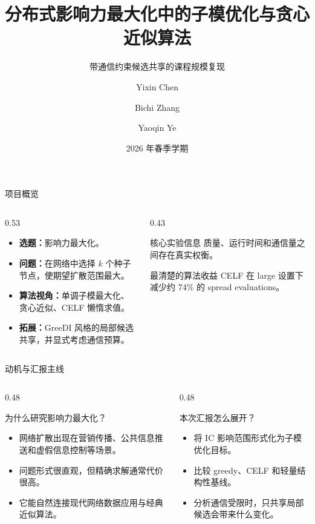 \documentclass[UTF8, 10pt, aspectratio=169]{ctexbeamer}
\title[分布式影响力最大化]{分布式影响力最大化中的子模优化与贪心近似算法}
\subtitle{带通信约束候选共享的课程规模复现}
\author{Yixin Chen \and Bichi Zhang \and Yaoqin Ye}
\institute{CS240：算法设计与分析}
\date{2026 年春季学期}
\newcommand{\metricbox}[2]{%
    \begin{block}{#1}
        \centering\Large #2
    \end{block}
}
\begin{document}
\begin{frame}
    \titlepage
\end{frame}

\begin{frame}{项目概览}
    \begin{columns}[T,onlytextwidth]
        \begin{column}{0.53\linewidth}
            \begin{itemize}
                \item \textbf{选题：}影响力最大化。
                \item \textbf{问题：}在网络中选择 $k$ 个种子节点，使期望扩散范围最大。
                \item \textbf{算法视角：}单调子模最大化、贪心近似、CELF 懒惰求值。
                \item \textbf{拓展：}GreeDI 风格的局部候选共享，并显式考虑通信预算。
            \end{itemize}
        \end{column}
        \begin{column}{0.43\linewidth}
            \metricbox{核心实验信息}{质量、运行时间和通信量之间存在真实权衡。}
            \metricbox{最清楚的算法收益}{CELF 在 large 设置下减少约 74\% 的 spread evaluations。}
        \end{column}
    \end{columns}
\end{frame}

\begin{frame}{动机与汇报主线}
    \begin{columns}[T,onlytextwidth]
        \begin{column}{0.48\linewidth}
            \begin{block}{为什么研究影响力最大化？}
                \begin{itemize}
                    \item 网络扩散出现在营销传播、公共信息推送和虚假信息控制等场景。
                    \item 问题形式很直观，但精确求解通常代价很高。
                    \item 它能自然连接现代网络数据应用与经典近似算法。
                \end{itemize}
            \end{block}
        \end{column}
        \begin{column}{0.48\linewidth}
            \begin{block}{本次汇报怎么展开？}
                \begin{itemize}
                    \item 将 IC 影响范围形式化为子模优化目标。
                    \item 比较 greedy、CELF 和轻量结构性基线。
                    \item 分析通信受限时，只共享局部候选会带来什么变化。
                \end{itemize}
            \end{block}
        \end{column}
    \end{columns}
\end{frame}
\end{document}
